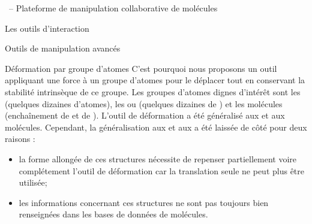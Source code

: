 \documentclass[myfrancais,ngerman,english,frenchb]{mythesis}
\begin{document}
\begin{mychapter}{\myShaddock\ -- Plateforme de manipulation collaborative de molécules}
\begin{mysection}{Les outils d'interaction}
\begin{mysubsection}{Outils de manipulation avancés}
\begin{mysubsubsection}{Déformation par groupe d'atomes}
					C'est pourquoi nous proposons un outil appliquant une force à un groupe d'atomes pour le déplacer tout en conservant la stabilité intrinsèque de ce groupe.
					Les groupes d'atomes dignes d'intérêt sont les  (quelques dizaines d'atomes), les \myhelice* ou \myfeuillet* (quelques dizaines de ) et les molécules (enchaînement de \myhelice* et de \myfeuillet*).
					L'outil de déformation a été généralisé aux  et aux molécules.
					Cependant, la généralisation aux \myhelice* et aux \myfeuillet* a été laissée de côté pour deux raisons :
					\begin{itemize}
						\item la forme allongée de ces structures nécessite de repenser partiellement voire complétement l'outil de déformation car la translation seule ne peut plus être utilisée;
						\item les informations concernant ces structures ne sont pas toujours bien renseignées dans les bases de données de molécules.
					\end{itemize}


\end{mysubsubsection}
\end{mysubsection}
\end{mysection}
\end{mychapter}
\end{document}

